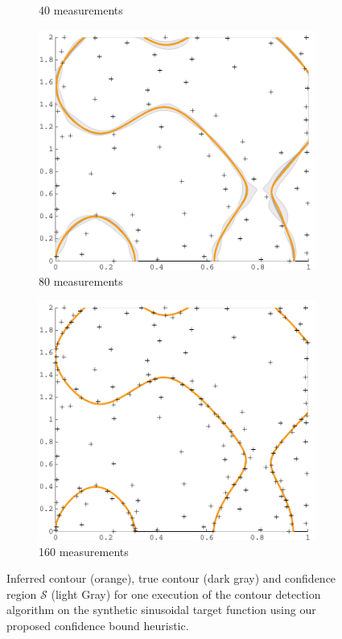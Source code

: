 \documentclass[11pt]{article} %
\begin{document}
\begin{figure}[tb]
\begin{subfigure}[b]{0.5\textwidth}
    \caption{40 measurements}
  \end{subfigure}
  \begin{subfigure}[b]{0.5\textwidth}
    \centering
    \includegraphics[width=\textwidth]{figures/sin2d_80}
    \caption{80 measurements}
  \end{subfigure}
  \hfill
  \begin{subfigure}[b]{0.5\textwidth}
    \centering
    \includegraphics[width=\textwidth]{figures/sin2d_160}
    \caption{160 measurements}
  \end{subfigure}
  \caption{Inferred contour (orange), true contour (dark gray) and confidence
           region $\mathcal{S}$ (light Gray) for one execution of the
           contour detection algorithm on the synthetic sinusoidal target
           function using our proposed confidence bound heuristic.}
  \label{fig:sin2d_steps}
\end{figure}
\end{document}
